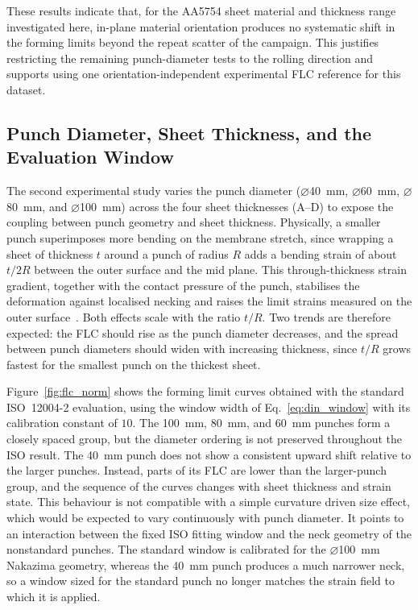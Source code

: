 These results indicate that, for the AA5754 sheet material and thickness range
investigated here, in-plane material orientation produces no systematic shift in
the forming limits beyond the repeat scatter of the campaign. This justifies
restricting the remaining punch-diameter tests to the rolling direction and
supports using one orientation-independent experimental FLC reference for this
dataset.

\subsection{Punch Diameter, Sheet Thickness, and the Evaluation Window}
\label{sec:punch_thickness}

The second experimental study varies the punch diameter
($\varnothing$\SI{40}{\milli\meter}, $\varnothing$\SI{60}{\milli\meter},
$\varnothing$\SI{80}{\milli\meter}, and
$\varnothing$\SI{100}{\milli\meter}) across the four sheet thicknesses (A--D)
to expose the coupling between punch geometry and sheet thickness. Physically,
a smaller punch superimposes more bending on the membrane stretch, since
wrapping a sheet of thickness $t$ around a punch of radius $R$ adds a bending
strain of about $t/2R$ between the outer surface and the mid plane. This
through-thickness strain gradient, together with the contact pressure of the
punch, stabilises the deformation against localised necking and raises the
limit strains measured on the outer
surface~\cite{Charpentier1975, Min2016}. Both effects scale with the ratio
$t/R$. Two trends are therefore expected: the FLC should rise
as the punch diameter decreases, and the spread between punch diameters
should widen with increasing thickness, since $t/R$ grows fastest for the
smallest punch on the thickest sheet.

Figure~\ref{fig:flc_norm} shows the forming limit curves obtained with the
standard ISO~12004-2 evaluation, using the window width of
Eq.~\eqref{eq:din_window} with its calibration constant of $10$. The
\SI{100}{\milli\meter}, \SI{80}{\milli\meter}, and \SI{60}{\milli\meter}
punches form a closely spaced group, but the diameter ordering is not preserved
throughout the ISO result. The \SI{40}{\milli\meter} punch does not show a
consistent upward shift relative to the larger punches. Instead, parts of its
FLC are lower than the larger-punch group, and the sequence of the curves
changes with sheet thickness and strain state. This behaviour is not
compatible with a simple curvature driven size effect, which would be expected
to vary continuously with punch diameter. It points to an interaction between
the fixed ISO fitting window and the neck geometry of the nonstandard punches.
The standard window is calibrated for the
$\varnothing$\SI{100}{\milli\meter} Nakazima geometry, whereas the
\SI{40}{\milli\meter} punch produces a much narrower neck, so a window sized
for the standard punch no longer matches the strain field to which it is
applied.

